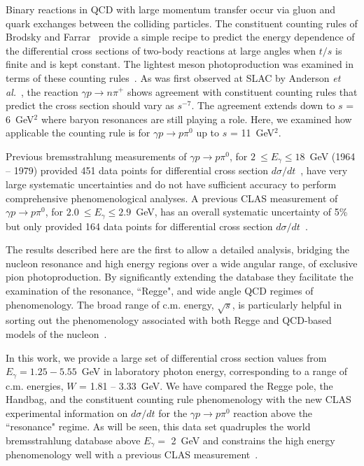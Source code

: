 \documentclass[aps,prc,twocolumn,floatfix,showpacs,preprintnumbers,amsmath,amssymb,superscriptaddress,linenumbers]{revtex4-1}
\begin{document}
Binary reactions in QCD with large momentum transfer 
occur via gluon and quark exchanges between the colliding particles. The 
constituent counting rules of Brodsky and Farrar~\cite{Brodsky:1973kr} 
provide a simple recipe to predict the energy dependence of the 
differential cross sections of two-body reactions at large angles 
when $t/s$ is finite and is kept constant.  The lightest meson 
photoproduction was examined in terms of these counting 
rules~\cite{Anderson:1976ph,Jenkins:1995bk,Zhu:2002su,Chen:2009sda,
Kong:2015yzn}. As was first observed at SLAC by 
Anderson \textit{et al.}~\cite{Anderson:1976ph}, the reaction $\gamma p\rightarrow n \pi^+$ 
shows agreement with constituent counting rules that predict the 
cross section should vary as $s^{-7}$. The 
agreement extends down to $s$ = 6~GeV$^2$ where baryon resonances are 
still playing a role.  Here, we examined how applicable the counting rule is 
for $\gamma p\rightarrow  p\pi^0$ up to $s$ = 11~GeV$^2$. 

Previous bremsstrahlung measurements of $\gamma p\rightarrow p\pi^0$, for $2~\leq E_{\gamma} \leq 
18$~GeV (1964 -- 1979) provided 451 data points for differential cross section $d\sigma/dt$~\cite{brem}, have very large systematic 
uncertainties and do not have sufficient accuracy to perform 
comprehensive phenomenological analyses.  A previous CLAS measurement of $\gamma p\rightarrow p\pi^0$, for $2.0~\leq E_{\gamma} \leq 2.9$~GeV, has an overall systematic uncertainty of 5\% but only provided 164 data points for differential cross section $d\sigma/dt$~\cite{Dugger:2007bt}.

The results described here are the first to allow a detailed analysis, bridging the nucleon resonance and high energy regions over a wide angular range, of exclusive pion photoproduction. By significantly extending the database they facilitate
the examination
%		 
		of the resonance, ``Regge", and wide angle QCD regimes of phenomenology. The 
		broad range of c.m. energy, $\sqrt{s}$, is particularly helpful in 
		sorting out the phenomenology associated with both Regge and QCD-based 
		models of the nucleon~\cite{Kroll:2017hym}.

In this work, we provide a large set of differential 
cross section values from $E_{\gamma} = 1.25-5.55$~GeV in laboratory photon 
energy, corresponding to a range of c.m. energies, $W$ = 1.81 -- 
3.33~GeV.  We have compared the Regge pole, the Handbag, and the 
constituent counting rule phenomenology with the new CLAS experimental 
information on $d\sigma/dt$ for the $\gamma p\rightarrow  p\pi^0$ 
reaction above the ``resonance" regime. As will be seen, this data 
set quadruples the world bremsstrahlung database above $E_{\gamma} =$ 2~GeV and 
constrains the high energy phenomenology well with a previous CLAS 
measurement~\cite{Dugger:2007bt}.
\end{document}
